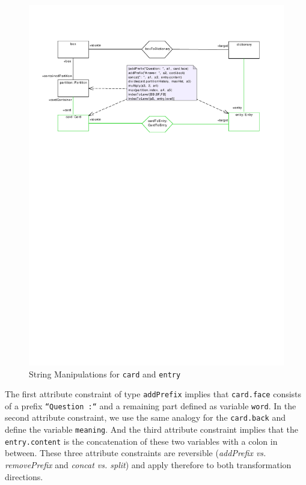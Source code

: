 \begin{figure}[htbp]
\begin{center}
  \includegraphics[width=\textwidth]{pics/tggBilder/tggRule/tgg20}
  \caption{String Manipulations for \texttt{card} and \texttt{entry}}  
  \label{fig:cardtoentry_2}
\end{center}
\end{figure}

The first attribute constraint of type \texttt{addPrefix} implies that \texttt{card.face} 
consists of a prefix \texttt{``Question :``} and a remaining part defined as variable \texttt{word}.
In the second attribute constraint, we use the same analogy for the \texttt{card.back} and define the variable \texttt{meaning}. 
And the third attribute constraint implies that the \texttt{entry.content} is the concatenation of these two variables with a colon in between.
These three attribute constraints are reversible (\emph{addPrefix vs. removePrefix} and \emph{concat vs. split}) and apply therefore to both transformation directions. 

